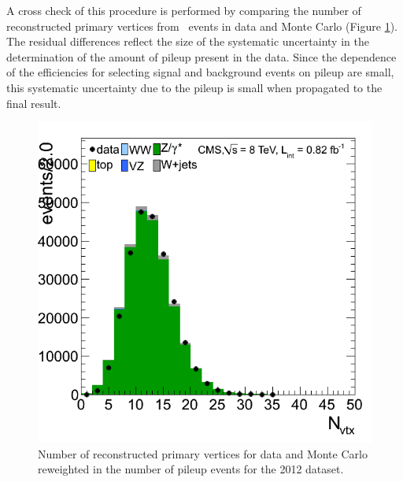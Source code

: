 A cross check of this procedure is performed by comparing the number of 
reconstructed primary vertices from \zmm\ events in data and Monte Carlo
(Figure \ref{fig:PUValidation_Full2012}). 
The residual differences 
reflect the size of the systematic uncertainty in the determination 
of the amount of pileup present in the data. Since the dependence 
of the efficiencies for selecting signal and background events on 
pileup are small, this systematic uncertainty due to the pileup 
is small when propagated to the final 
result.

\begin{figure}[hbt]
\begin{center}
\includegraphics[width=0.45\linewidth]{figures/nvtx_mh0_nj_mm.png}
\caption{\label{fig:PUValidation_Full2012} Number of reconstructed primary vertices for data and Monte Carlo reweighted in the number 
of pileup events for the 2012 dataset.}
\end{center}
\end{figure}

